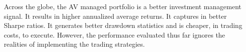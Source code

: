 Across the globe, the AV managed portfolio is a better investment management signal. It results in higher annualized average returns. It captures in better Sharpe ratios. It generates better drawdown statistics and is cheaper, in trading costs, to execute.
However, the performance evaluated thus far ignores the realities of implementing the trading strategies. %